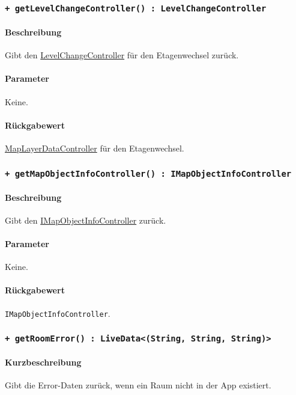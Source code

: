 \subsubsection*{\texttt{+ getLevelChangeController() : LevelChangeController}}\label{App_Map_ViewModel_getLevelChangeController}%
\paragraph*{Beschreibung}
Gibt den \hyperref[App_Map_ViewModel_LevelChangeController]{LevelChangeController} für den Etagenwechsel zurück.
\paragraph*{Parameter}
Keine.
\paragraph*{Rückgabewert}
\hyperref[App_Map_ViewModel_MapLayerDataController]{MapLayerDataController} für den Etagenwechsel.

\subsubsection*{\texttt{+ getMapObjectInfoController() : IMapObjectInfoController}}\label{App_Map_ViewModel_getMapObjectInfoController}%
\paragraph*{Beschreibung}
Gibt den \hyperref[App_Map_ViewModel_IMapObjectInfoController]{IMapObjectInfoController} zurück.
\paragraph*{Parameter}
Keine.
\paragraph*{Rückgabewert}
\texttt{IMapObjectInfoController}.

\subsubsection*{\texttt{+ getRoomError() : LiveData<(String, String, String)>}}\label{App_Map_ViewModel_getRoomError}%
\paragraph*{Kurzbeschreibung}
Gibt die Error-Daten zurück, wenn ein Raum nicht in der App existiert.
